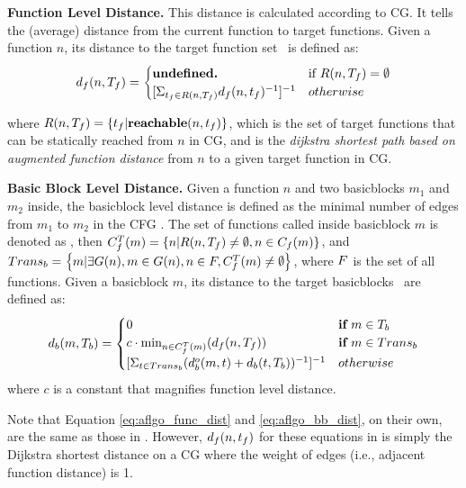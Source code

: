 \textbf{Function Level Distance.} This distance is calculated according to CG. It tells the (average) distance from the current function to target functions. Given a function $n$, its distance to the target function set \tgtfnset~is defined as:
\begin{equation}
d_f(n, \tgtfnset) =
\begin{cases}
\textbf{undefined.} & \text{if}~R(n, \tgtfnset)=\emptyset \\
[\Sigma_{\tgtfn\in R(n, \tgtfnset)} \traceFnDist{n}{\tgtfn}^{-1}]^{-1} & otherwise \\
\end{cases}
\label{eq:aflgo_func_dist}
\end{equation}

where $R(n, T_f) = \left\{t_f | \textbf{reachable}(n, t_f)\right\}$,
which is the set of target functions that can be statically reached from $n$ in CG, and  is the \emph{dijkstra shortest path based on augmented function distance} from $n$ to a given target function {\tgtfn} in CG.

\textbf{Basic Block Level Distance.} Given a function $n$ and two basicblocks $m_1$ and $m_2$ inside, the basicblock level distance  is defined as the minimal number of edges from $m_1$ to $m_2$ in the CFG .
The set of functions called inside basicblock $m$ is denoted as ,
then $C_f^T(m)=\left\{n | R(n, T_f)\neq\emptyset, n\in C_f(m) \right\}$, 
and $Trans_b=\left\{m| \exists G(n), m\in G(n), n\in F, C_f^T(m)\neq\emptyset \right\}$, where $F$ is the set of all functions.
Given a basicblock $m$, its distance to the target basicblocks \tgtbbset~are defined as:
\begin{equation}
d_b(m, T_b) = 
\begin{cases}
0 & \textbf{if}~m\in T_b \\
c\cdot \text{min}_{n\in C_f^T(m)}(d_f(n,T_f))& \textbf{if}~m\in Trans_b\\
\Large[\Sigma_{t\in Trans_b}\large(d_b^o(m,t) + d_b(t, T_b)\large)^{-1}\Large]^{-1} & otherwise
\end{cases}
\label{eq:aflgo_bb_dist}
\end{equation}
where $c$ is a constant that magnifies function level distance.

Note that Equation \ref{eq:aflgo_func_dist} and \ref{eq:aflgo_bb_dist}, on their own, are the same as those in \aflgo \cite{Bohme:2017:DGF}. However, $d_f(n,t_f)$ for these equations in \aflgo is simply the Dijkstra shortest distance on a CG where the weight of edges (i.e., adjacent function distance) is 1.

